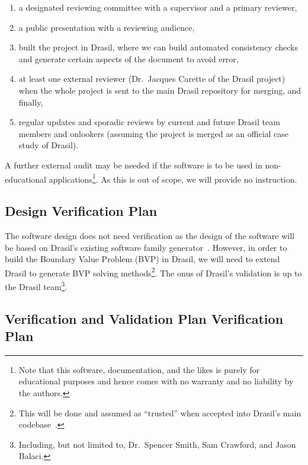 \documentclass[12pt, titlepage]{article}
\begin{document}
\begin{enumerate}

    \item a designated reviewing committee with a supervisor and a primary
          reviewer,

    \item a public presentation with a reviewing audience,

    \item built the project in Drasil, where we can build automated consistency
          checks and generate certain aspects of the document to avoid error,

    \item at least one external reviewer (Dr.\ Jacques Carette of the Drasil
          project) when the whole \progname{} project is sent to the main Drasil
          repository for merging, and finally,

    \item regular updates and sporadic reviews by current and future Drasil team
          members and onlookers (assuming the project is merged as an official
          case study of Drasil).

\end{enumerate}

A further external audit may be needed if the software is to be used in
non-educational applications\footnote{Note that this software, documentation,
and the likes is purely for educational purposes and hence comes with no
warranty and no liability by the authors.}. As this is out of scope, we will
provide no instruction.

\subsection{Design Verification Plan}

The software design does not need verification as the design of the software
will be based on Drasil's existing software family generator~\cite{Drasil2023}.
However, in order to build the Boundary Value Problem (BVP) in Drasil, we will
need to extend Drasil to generate BVP solving methods\footnote{This will be done
    and assumed as ``trusted'' when accepted into Drasil's main
    codebase~\cite{Drasil2023}.}. The onus of Drasil's validation is up to the
Drasil team\footnote{Including, but not limited to, Dr.\ Spencer Smith, Sam
    Crawford, and Jason Balaci.}.

\subsection{Verification and Validation Plan Verification Plan}
\end{document}
